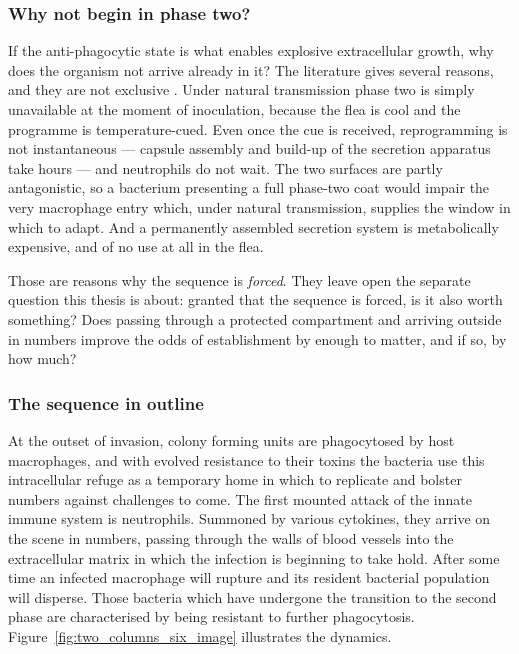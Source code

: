 \subsubsection*{Why not begin in phase two?}

If the anti-phagocytic state is what enables explosive extracellular growth,
why does the organism not arrive already in it? The literature gives several
reasons, and they are not exclusive \cite{KeEtAl2013,PujolBliska2005}. Under
natural transmission phase two is simply unavailable at the moment of
inoculation, because the flea is cool and the programme is temperature-cued.
Even once the cue is received, reprogramming is not instantaneous --- capsule
assembly and build-up of the secretion apparatus take hours --- and neutrophils
do not wait. The two surfaces are partly antagonistic, so a bacterium
presenting a full phase-two coat would impair the very macrophage entry which,
under natural transmission, supplies the window in which to adapt. And a
permanently assembled secretion system is metabolically expensive, and of no
use at all in the flea.

Those are reasons why the sequence is \emph{forced}. They leave open the
separate question this thesis is about: granted that the sequence is forced, is
it also worth something? Does passing through a protected compartment and
arriving outside in numbers improve the odds of establishment by enough to
matter, and if so, by how much?

\subsubsection*{The sequence in outline}

At the outset of invasion, colony forming units are phagocytosed by host
macrophages, and with evolved resistance to their toxins the bacteria use this
intracellular refuge as a temporary home in which to replicate and bolster
numbers against challenges to come. The first mounted attack of the innate immune system is
neutrophils. Summoned by various cytokines, they arrive on the scene in
numbers, passing through the walls of blood vessels into the extracellular
matrix in which the infection is beginning to take hold. After some time an
infected macrophage will rupture and its resident bacterial population will
disperse. Those \yp{} bacteria which have undergone the transition to the
second phase are characterised by being resistant to further phagocytosis.
Figure~\ref{fig:two_columns_six_image} illustrates the dynamics.

